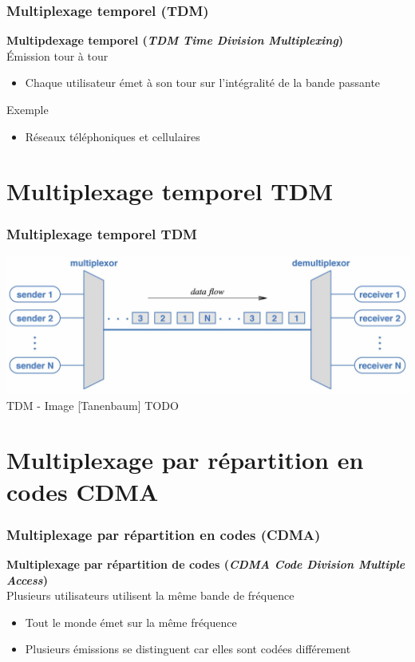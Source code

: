 \begin{frame}[fragile]
  \frametitle{Multiplexage temporel (TDM)}
{\bf\large Multipdexage temporel (\textit{TDM Time Division Multiplexing})}\\
Émission tour à tour
\begin{itemize}
	\item Chaque utilisateur émet à son tour sur l'intégralité de la bande passante
\end{itemize}
\vspace{1cm}
Exemple
\begin{itemize}
	\item Réseaux téléphoniques et cellulaires
\end{itemize}
\end{frame}

\section{Multiplexage temporel TDM}

\begin{frame}[fragile]
  \frametitle{Multiplexage temporel TDM}
\begin{center}
	\includegraphics[width=.8\linewidth]{img/2-27-tmp.jpg}\\
	{\scriptsize TDM - Image [Tanenbaum] TODO}
\end{center}
\end{frame}



\section{Multiplexage par répartition en codes CDMA}

\begin{frame}[fragile]
  \frametitle{Multiplexage par répartition en codes (CDMA)}
{\large\bf Multiplexage par répartition de codes 
(\textit{CDMA Code Division Multiple Access})}\\
Plusieurs utilisateurs utilisent la même bande de fréquence
\begin{itemize}
	\item Tout le monde émet sur la même fréquence
	\item Plusieurs émissions se distinguent car elles sont codées différement
\end{itemize}
\end{frame}

